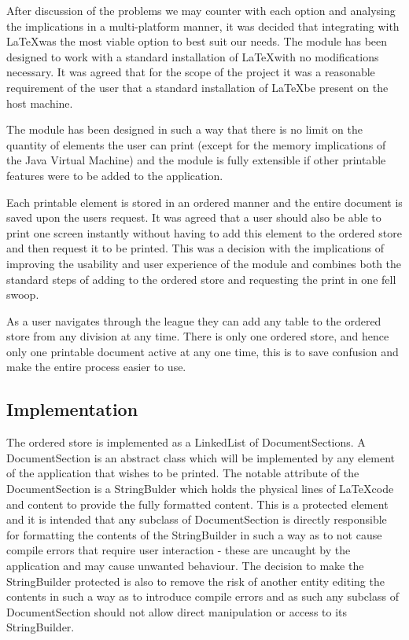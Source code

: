 After discussion of the problems we may counter with each option and
analysing the implications in a multi-platform manner, it was decided
that integrating with \LaTeX was the most viable option to best suit
our needs. The module has been designed to work with a standard
installation of \LaTeX with no modifications necessary. It was agreed
that for the scope of the project it was a reasonable requirement of
the user that a standard installation of \LaTeX be present on the host
machine.

The module has been designed in such a way that there is no limit on
the quantity of elements the user can print (except for the memory
implications of the Java Virtual Machine) and the module is fully
extensible if other printable features were to be added to the
application.

Each printable element is stored in an ordered manner and
the entire document is saved upon the users request. It was agreed
that a user should also be able to print one screen instantly without
having to add this element to the ordered store and then request it to
be printed. This was a decision with the implications of improving the
usability and user experience of the module and combines both the
standard steps of adding to the ordered store and requesting the print
in one fell swoop.

As a user navigates through the league they can add any table to the
ordered store from any division at any time. There is only one ordered
store, and hence only one printable document active at any one time,
this is to save confusion and make the entire process easier to use.

\subsection{Implementation}

The ordered store is implemented as a LinkedList of
DocumentSections. A DocumentSection is an abstract class which will
be implemented by any element of the application that wishes to be
printed. The notable attribute of the DocumentSection is a StringBulder
which holds the physical lines of \LaTeX code and content to provide
the fully formatted content. This is a protected element and it is
intended that any subclass of DocumentSection is directly responsible
for formatting the contents of the StringBuilder in such a way as to
not cause compile errors that require user interaction - these are
uncaught by the application and may cause unwanted behaviour. The
decision to make the StringBuilder protected is also to remove the
risk of another entity editing the contents in such a way as to
introduce compile errors and as such any subclass of DocumentSection
should not allow direct manipulation or access to its StringBuilder.

